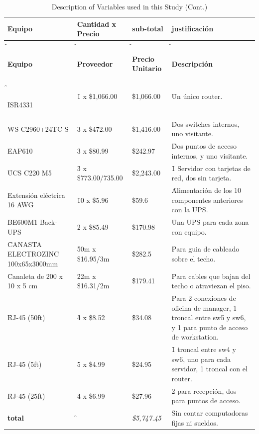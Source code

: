     \begin{xltabular}{\linewidth}{|>{\f}X|>{\f}X|>{\f}X|>{\f}X|}
        \caption{Lista de tipos de electrónica de red utilizada}
        \label{tab: presupuesto}                                  
        \hline
        \textbf{Equipo} & \textbf{Cantidad x Precio} & \textbf{sub-total} & \textbf{justificación} \\   
        \hline 
        \endfirsthead
        \caption[]{Description of Variables used in this Study (Cont.)} \\
        \hline
        \textbf{Equipo} & \textbf{Proveedor} & \textbf{Precio Unitario} & \textbf{Descripción} \\   
        \hline
        \endhead
        \endfoot
        \hline
        \endlastfoot
        
        ISR4331                           & 1 x \$1,066.00      & \$1,066.00 & Un único router. \\  \hline
        WS-C2960+24TC-S                   & 3 x \$472.00        & \$1,416.00 & Dos switches internos, uno visitante. \\  \hline
        EAP610                            & 3 x \$80.99         & \$242.97   & Dos puntos de acceso internos, y uno visitante. \\  \hline
        UCS C220 M5                       & 3 x \$773.00/735.00 & \$2,243.00 & 1 Servidor con tarjetas de red, dos sin tarjeta. \\  \hline
        Extensión eléctrica 16 AWG        & 10 x \$5.96         & \$59.6     & Alimentación de los 10 componentes anteriores con la UPS. \\  \hline
        BE600M1 Back-UPS                  & 2 x \$85.49         & \$170.98   & Una UPS para cada zona con equipo. \\  \hline
        CANASTA ELECTROZINC 100x65x3000mm & 50m x \$16.95/3m    & \$282.5    & Para guia de cableado sobre el techo. \\  \hline
        Canaleta de 200 x 10 x 5 cm       & 22m x \$16.31/2m    & \$179.41   & Para cables que bajan del techo o atraviezan el piso. \\  \hline
        RJ-45 (50ft)                      & 4 x \$8.52          & \$34.08    & Para 2 conexiones de oficina de manager, 1 troncal entre sw5 y sw6, y 1 para punto de acceso de workstation. \\ \hline
        RJ-45 (5ft)                       & 5 x \$4.99          & \$24.95    & 1 troncal entre sw4 y sw6, uno para cada servidor, 1 troncal con el router. \\ \hline
        RJ-45 (25ft)                      & 4 x \$6.99          & \$27.96    & 2 para recepción, dos para puntos de acceso. \\ \hline
        \textbf{total}                    &                     & {\it \$5,747.45} & Sin contar computadoras fijas ni sueldos. \\ \hline
    \end{xltabular}

